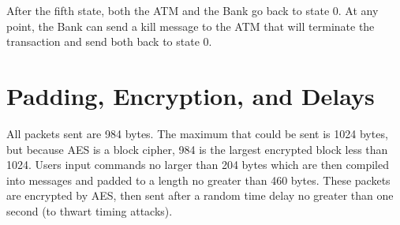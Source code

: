 \documentclass[10pt,a4paper]{article}
\begin{document}
After the fifth state, both the ATM and the Bank go back to state 0. At any point, the Bank can send a kill message to the ATM that will terminate the transaction and send both back to state 0.

\section{Padding, Encryption, and Delays}

All packets sent are 984 bytes. The maximum that could be sent is 1024 bytes, but because AES is a block cipher, 984 is the largest encrypted block less than 1024. Users input commands no larger than 204 bytes which are then compiled into messages and padded to a length no greater than 460 bytes. These packets are encrypted by AES, then sent after a random time delay no greater than one second (to thwart timing attacks).
\end{document}
